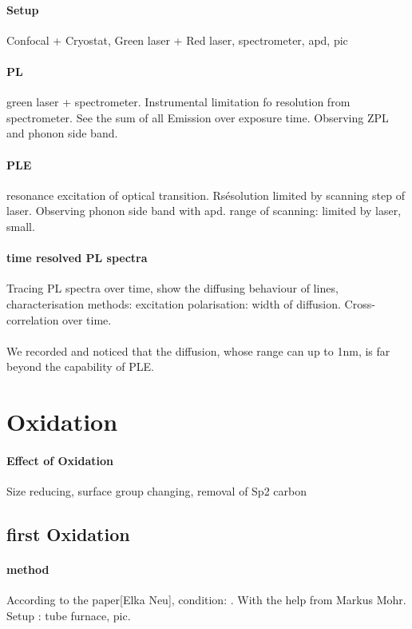 \paragraph{Setup} Confocal + Cryostat, Green laser + Red laser, spectrometer, apd, pic

\paragraph{PL} green laser + spectrometer. Instrumental limitation fo resolution from spectrometer. See the sum of all Emission over exposure time. Observing ZPL and phonon side band.

\paragraph{PLE} resonance excitation of optical transition. Rsésolution limited by scanning step of laser. Observing phonon side band with apd. range of scanning: limited by laser, small.

\paragraph{time resolved PL spectra} Tracing PL spectra over time, show the diffusing behaviour of lines, characterisation methods: excitation polarisation: width of diffusion. Cross- correlation over time.
\paragraph{}We recorded and noticed that the diffusion, whose range can up to 1nm, is far beyond the capability of PLE. 

\section{Oxidation}
\paragraph{Effect of Oxidation} Size reducing, surface group changing, removal of Sp2 carbon

\subsection[first Oxidation]{first Oxidation}
\paragraph{method}According to the paper[Elka Neu], condition: . With the help from Markus Mohr. Setup : tube furnace, pic. 

